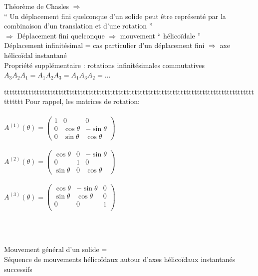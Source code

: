 Théorème de Chasles $\Rightarrow$ \\
“ Un déplacement fini {\color{orange}quelconque} d’un solide peut être représenté par la {\color{orange}combinaison} d’un {\color{orange}translation} et d’une {\color{orange}rotation} ”\\
$\Rightarrow$ Déplacement fini quelconque $\Rightarrow$ mouvement “ hélicoïdale ”\\

Déplacement infinitésimal = cas particulier d'un déplacement fini $\Rightarrow$ axe hélicoïdal instantané\\
Propriété supplémentaire : rotations infinitésimales commutatives\\
$A_3A_2A_1 = A_1A_2A_3 = A_1A_3A_2 = ...$\\

\begin{bluebox}
\begin{tabbing}
ttttttttttttttttttttttt\=tttttttttttttttttttttttttttttttttttttttttttttttttttttttttttttttttttttttttttt\kill
Pour rappel, les matrices de rotation: \\\\
\>$A^{(1)}(\theta)= \begin{pmatrix}
1&0&0 \\
0&\cos\theta&-\sin\theta\\
0&\sin\theta&\cos\theta
\end{pmatrix}$\\\\
\>$A^{(2)}(\theta)= \begin{pmatrix}
\cos\theta&0&-\sin\theta \\
0&1&0\\
\sin\theta&0&\cos\theta
\end{pmatrix}$\\\\
\>$A^{(3)}(\theta)= \begin{pmatrix}
\cos\theta&-\sin\theta&0\\
\sin\theta&\cos\theta&0\\
0&0&1\\
\end{pmatrix}$\\
\end{tabbing}
\end{bluebox}\\\\

\begin{orangebox}
Mouvement général d’un solide = \\
{\color{orange}Séquence} de mouvements {\color{orange}hélicoïdaux} autour d’{\color{orange}axes hélicoïdaux instantanés} successifs
\end{orangebox}\\\\

